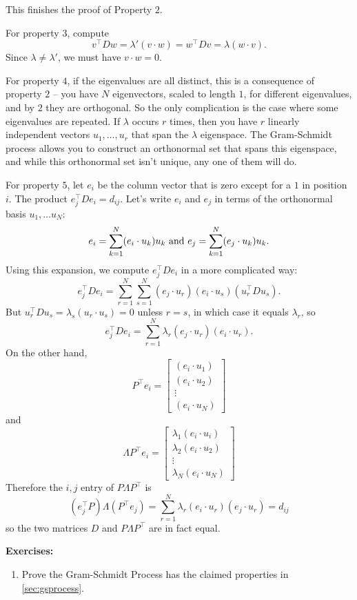 \documentclass[
]{article}
\providecommand{\tightlist}{%
  \setlength{\itemsep}{0pt}\setlength{\parskip}{0pt}}
\begin{document}
This finishes the proof of Property \(2\).

For property \(3\), compute \[
v^{\intercal}Dw = \lambda'(v\cdot w)=w^{\intercal}Dv = \lambda (w\cdot v).
\] Since \(\lambda\not=\lambda'\), we must have \(v\cdot w=0\).

For property \(4\), if the eigenvalues are all distinct, this is a
consequence of property \(2\) -- you have \(N\) eigenvectors, scaled to
length \(1\), for different eigenvalues, and by \(2\) they are
orthogonal. So the only complication is the case where some eigenvalues
are repeated. If \(\lambda\) occurs \(r\) times, then you have \(r\)
linearly independent vectors \(u_{1},\ldots, u_{r}\) that span the
\(\lambda\) eigenspace. The Gram-Schmidt process allows you to construct
an orthonormal set that spans this eigenspace, and while this
orthonormal set isn't unique, any one of them will do.

For property \(5\), let \(e_{i}\) be the column vector that is zero
except for a \(1\) in position \(i\). The product
\(e_{j}^{\intercal}De_{i}=d_{ij}\). Let's write \(e_{i}\) and \(e_{j}\)
in terms of the orthonormal basis \(u_{1},\ldots u_{N}\): \[
e_{i} = \sum_{k=1}^{N} (e_{i}\cdot u_{k})u_k \hbox{ and } e_{j} = \sum_{k=1}^{N}(e_{j}\cdot u_{k})u_{k}.
\] Using this expansion, we compute \(e_{j}^{\intercal}De_{i}\) in a
more complicated way: \[
e_{j}^{\intercal}De_{i} = \sum_{r=1}^{N}\sum_{s=1}^{N} (e_{j}\cdot u_{r})(e_{i}\cdot u_{s})(u_{r}^{\intercal}Du_{s}).
\] But \(u_{r}^{\intercal}Du_{s}=\lambda_{s}(u_{r}\cdot u_{s})=0\)
unless \(r=s\), in which case it equals \(\lambda_{r}\), so \[
e_{j}^{\intercal}De_{i} = \sum_{r=1}^{N} \lambda_{r}(e_{j}\cdot u_{r})(e_{i}\cdot u_{r}).
\] On the other hand, \[
P^{\intercal}e_{i} = \left[\begin{matrix} (e_{i}\cdot u_{1})\\ (e_{i}\cdot u_{2})\\ \vdots \\(e_{i}\cdot u_{N})\end{matrix}\right]
\] and \[
\Lambda P^{\intercal}e_{i} = \left[\begin{matrix} \lambda_{1}(e_{i}\cdot u_{i})\\ \lambda_{2}(e_{i}\cdot u_{2})\\ \vdots \\ \lambda_{N}(e_{i}\cdot u_{N})\end{matrix}\right]
\] Therefore the \(i,j\) entry of \(P\Lambda P^{\intercal}\) is \[
(e_{j}^{\intercal}P)\Lambda (P^{\intercal}e_{j}) = \sum_{r=1}^{N} \lambda_{r}(e_{i}\cdot u_{r})(e_{j}\cdot u_{r}) = d_{ij}
\] so the two matrices \(D\) and \(P\Lambda P^{\intercal}\) are in fact
equal.

\textbf{Exercises:}

\begin{enumerate}
\def\labelenumi{\arabic{enumi}.}
\tightlist
\item
  Prove the Gram-Schmidt Process has the claimed properties in
  \cref{sec:gsprocess}.
\end{enumerate}
\end{document}
